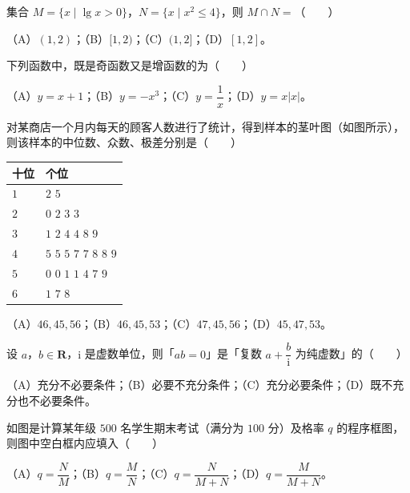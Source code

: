 

\begin{question}
集合 $M=\{x\mid\lg x>0\}$，$N=\{x\mid x^2\leqslant4\}$，则 $M\cap N=$\mbox{（　　）}

（A）$(1,2)$；（B）$[1,2)$；（C）$(1,2]$；（D）$[1,2]$。

\end{question}
\begin{question}
下列函数中，既是奇函数又是增函数的为\mbox{（　　）}

（A）$y=x+1$；（B）$y=-x^3$；（C）$y=\dfrac1x$；（D）$y=x|x|$。

\end{question}
\begin{question}
对某商店一个月内每天的顾客人数进行了统计，得到样本的茎叶图（如图所示），则该样本的中位数、众数、极差分别是\mbox{（　　）}

\begin{center}
\begin{tabular}{ll}
\toprule
十位 & 个位 \\
\midrule
$1$ & $2$ $5$ \\
$2$ & $0$ $2$ $3$ $3$ \\
$3$ & $1$ $2$ $4$ $4$ $8$ $9$ \\
$4$ & $5$ $5$ $5$ $7$ $7$ $8$ $8$ $9$ \\
$5$ & $0$ $0$ $1$ $1$ $4$ $7$ $9$ \\
$6$ & $1$ $7$ $8$ \\
\bottomrule
\end{tabular}
\end{center}

（A）$46,45,56$；（B）$46,45,53$；（C）$47,45,56$；（D）$45,47,53$。

\end{question}
\begin{question}
设 $a$，$b\in\mathbf R$，$\mathrm i$ 是虚数单位，则「$ab=0$」是「复数 $a+\dfrac b{\mathrm i}$ 为纯虚数」的\mbox{（　　）}

（A）充分不必要条件；（B）必要不充分条件；（C）充分必要条件；（D）既不充分也不必要条件。

\Needspace{0.4\textheight}
\end{question}
\begin{question}
如图是计算某年级 $500$ 名学生期末考试（满分为 $100$ 分）及格率 $q$ 的程序框图，则图中空白框内应填入\mbox{（　　）}
\nopagebreak[4]
\begin{center}\end{center}
\nopagebreak[4]
（A）$q=\dfrac NM$；（B）$q=\dfrac MN$；（C）$q=\dfrac N{M+N}$；（D）$q=\dfrac M{M+N}$。

\end{question}
